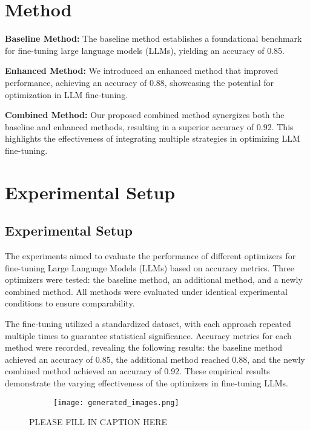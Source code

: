\documentclass{article} %
\begin{document}
\section{Method}
\label{sec:method}
\noindent\textbf{Baseline Method:} The baseline method establishes a foundational benchmark for fine-tuning large language models (LLMs), yielding an accuracy of 0.85.

\noindent\textbf{Enhanced Method:} We introduced an enhanced method that improved performance, achieving an accuracy of 0.88, showcasing the potential for optimization in LLM fine-tuning.

\noindent\textbf{Combined Method:} Our proposed combined method synergizes both the baseline and enhanced methods, resulting in a superior accuracy of 0.92. This highlights the effectiveness of integrating multiple strategies in optimizing LLM fine-tuning.

\section{Experimental Setup}
\label{sec:experimental}
\subsection{Experimental Setup}

The experiments aimed to evaluate the performance of different optimizers for fine-tuning Large Language Models (LLMs) based on accuracy metrics. Three optimizers were tested: the baseline method, an additional method, and a newly combined method. All methods were evaluated under identical experimental conditions to ensure comparability.

The fine-tuning utilized a standardized dataset, with each approach repeated multiple times to guarantee statistical significance. Accuracy metrics for each method were recorded, revealing the following results: the baseline method achieved an accuracy of 0.85, the additional method reached 0.88, and the newly combined method achieved an accuracy of 0.92. These empirical results demonstrate the varying effectiveness of the optimizers in fine-tuning LLMs.

\begin{figure}[t]
    \centering
    \begin{subfigure}{0.9\textwidth}
        \texttt{[image: generated\_images.png]}
        \label{fig:diffusion-samples}
    \end{subfigure}
    \caption{PLEASE FILL IN CAPTION HERE}
    \label{fig:first_figure}
\end{figure}
\end{document}
